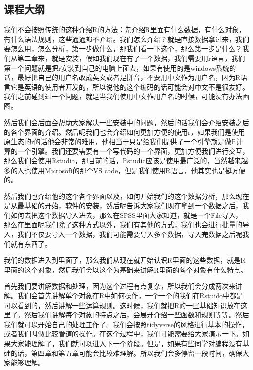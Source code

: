 \documentclass[
  oneside]{book}
\begin{document}
\hypertarget{ux8bfeux7a0bux5927ux7eb2}{%
\subsection{课程大纲}\label{ux8bfeux7a0bux5927ux7eb2}}

我们不会按照传统的这种介绍R的方法：先介绍R里面有什么数据，有什么对象，有什么语法规则，这些通通都不介绍。我们怎么介绍？就是直接数据拿过来，我们要怎么用，怎么分析，第一步做什么，那我们看一下这个，那么第一步是什么？我们从第二章来，就是安装，假如我们现在有了一个数据，我们需要用r语言，我们第一个问题就是把r安装到自己的电脑上面去，如果有使用的是windows系统的话，最好把自己的用户名改成英文或者是拼音，不要用中文作为用户名，因为R语言它是英语的使用者开发的，所以说他的这个编码的话可能会对中文不是很友好。我们之前碰到过一个问题，就是当我们使用中文作用户名的时候，可能没有办法画图。

然后我们会后面会帮助大家解决一些安装中的问题，然后的话我们会介绍安装之后的各个界面的介绍。然后呢我们也会介绍如何更加方便的使用r，如果我们是使用原生态的r的话他会非常的难用，他相当于只是给我们提供了一个引擎就是做R计算的一个引擎。我们还要需要有一个写代码的一个界面，更加方便我们进行交互，那么我们会使用Rstudio，那目前的话，Rstudio应该是使用最广泛的，当然越来越多的人也使用Microsoft的那个VS code，但是我们使用R语言，他其实也是挺方便的。

然后我们也介绍他的这个各个界面以及，如何开始我们的这个数据分析，那么现在是从最基础的开始，软件的安装，然后呢告诉大家我们现在拿到一个数据之后，我们如何去把这个数据导入进去，那么在SPSS里面大家知道，就是一个File导入，那么在里面呢我们除了这种方式以外，我们有其他的方式，我们也会进行批量的导入，我们不仅要导入一个数据，我们可能需要导入多个数据，导入完数据之后呢我们就有东西了。

我们的数据进入到里面了，那么我们从现在就开始认识R里面的这些数据，就是R里面的这个对象，然后我们会以这个为基础来讲解R里面的各个对象有什么特点。

首先我们要讲解数据和处理，因为这个过程有点复杂，所以我们会分成两次来讲解。我们会首先讲解单个对象在R中如何操作，一个一个的我们在Rstuido中都是可以看到的，然后讲解一些运算规则。这时候，我们就把R的一些基础知识放在这里了。然后我们讲解每个对象的特点之后，会展开介绍一些函数和规则等等。然后我们就可以开始自己的处理工作了。我们会按照tidyverse的风格进行基本的操作，或者我们叫做比较管道的操作。在这个过程中，我们可能需要给大家演示一下。如果大家能理解了，我们就可以进入下一个阶段。但是，如果有些同学对编程没有基础的话，第四章和第五章可能会比较难理解。所以我们会多停留一段时间，确保大家能够理解。
\end{document}
